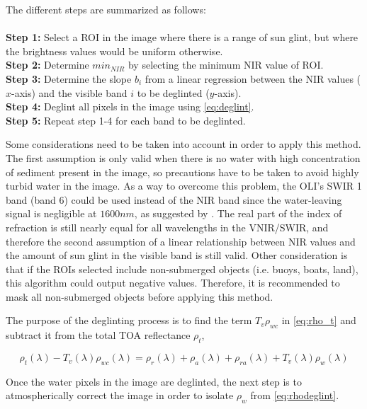The different steps are summarized as follows:\\
\\
{\bf Step 1:} Select a ROI in the image where there is a range of sun glint, but where the brightness values would be uniform otherwise.\\
{\bf Step 2:} Determine $min_{NIR}$ by selecting the minimum NIR value of ROI.\\
{\bf Step 3:} Determine the slope $b_i$ from a linear regression between the NIR values ($x$-axis) and the visible band $i$ to be deglinted ($y$-axis).\\
{\bf Step 4:} Deglint all pixels in the image using \autoref{eq:deglint}.\\
{\bf Step 5:} Repeat step 1-4 for each band to be deglinted.

Some considerations need to be taken into account in order to apply this method. The first assumption is only valid when there is no water with high concentration of sediment present in the image, so precautions have to be taken to avoid highly turbid water in the image. As a way to overcome this problem, the OLI's SWIR 1 band (band 6) could be used instead of the NIR band since the water-leaving signal is negligible at $1600nm$, as suggested by \cite{GeraceThesis}. The real part of the index of refraction is still nearly equal for all wavelengths in the VNIR/SWIR, and therefore the second assumption of a linear relationship between NIR values and the amount of sun glint in the visible band is still valid. Other consideration is that if the ROIs selected include non-submerged objects (i.e. buoys, boats, land), this algorithm could output negative values. Therefore, it is recommended to mask all non-submerged objects before applying this method. 

The purpose of the deglinting process is to find the term $T_v\rho_{wc}$ in \autoref{eq:rho_t} and subtract it from the total TOA reflectance $\rho_t$,

\begin{equation}\label{eq:rhodeglint}
  \rho_t(\lambda)-T_v(\lambda)\rho_{wc}(\lambda) = \rho_r(\lambda)+\rho_a(\lambda)+\rho_{ra}(\lambda)+T_v(\lambda)\rho_{w}(\lambda)
\end{equation}

Once the water pixels in the image are deglinted, the next step is to atmospherically correct the image in order to isolate $\rho_w$ from \autoref{eq:rhodeglint}.


